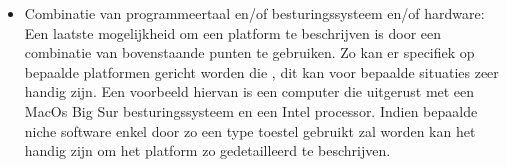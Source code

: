 \begin{itemize}
\item Combinatie van programmeertaal en/of besturingssysteem en/of hardware: 
Een laatste mogelijkheid om een platform te beschrijven is door een combinatie van bovenstaande punten te gebruiken. Zo kan er specifiek op bepaalde platformen gericht worden die , dit kan voor bepaalde situaties zeer handig zijn. Een voorbeeld hiervan is een computer die uitgerust met een MacOs Big Sur besturingssysteem en een Intel processor. Indien bepaalde niche software enkel door zo een type toestel gebruikt zal worden kan het handig zijn om het platform zo gedetailleerd te beschrijven.
\end{itemize}

\subsection{}
\label{sec:SVZontwikkelingsvormen}



\subsubsection{}
\label{sec:SVZnative}

\subsubsection{}
\label{sec:SVZcrossplatform}

